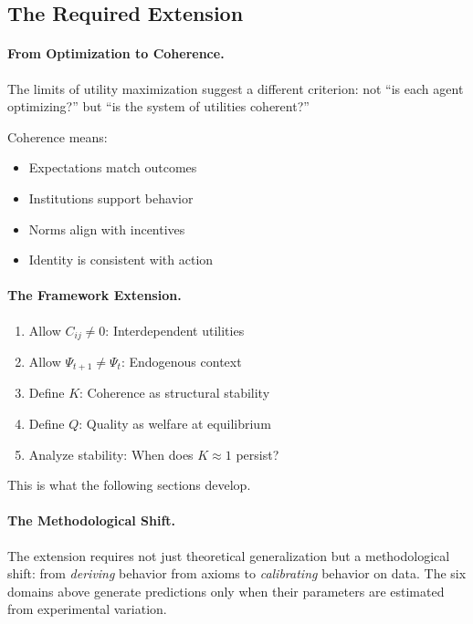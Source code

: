 \subsection{The Required Extension}

\paragraph{From Optimization to Coherence.}
The limits of utility maximization suggest a different criterion:
not ``is each agent optimizing?'' but ``is the system of utilities coherent?''

Coherence means:
\begin{itemize}
  \item Expectations match outcomes
  \item Institutions support behavior
  \item Norms align with incentives
  \item Identity is consistent with action
\end{itemize}

\paragraph{The Framework Extension.}
\begin{enumerate}
  \item Allow $C_{ij} \neq 0$: Interdependent utilities
  \item Allow $\Psi_{t+1} \neq \Psi_t$: Endogenous context
  \item Define $K$: Coherence as structural stability
  \item Define $Q$: Quality as welfare at equilibrium
  \item Analyze stability: When does $K \approx 1$ persist?
\end{enumerate}

This is what the following sections develop.

\paragraph{The Methodological Shift.}
The extension requires not just theoretical generalization but a methodological shift:
from \emph{deriving} behavior from axioms to \emph{calibrating} behavior on data.
The six domains above generate predictions only when their parameters are estimated
from experimental variation.

